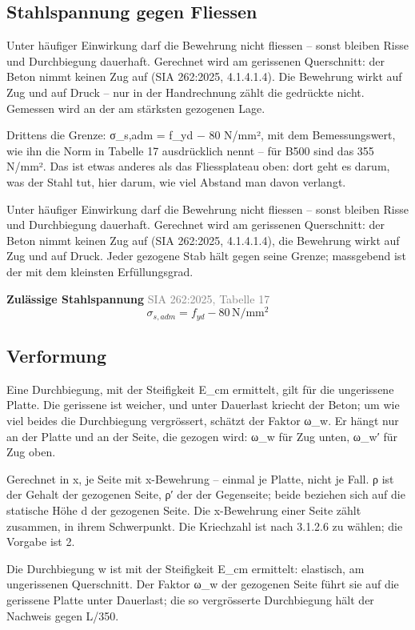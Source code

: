 \documentclass[11pt,a4paper]{article}
\newcommand{\normref}[1]{{\small\textcolor{gray}{#1}}}
\begin{document}
\subsection{Stahlspannung gegen Fliessen}
Unter häufiger Einwirkung darf die Bewehrung nicht fliessen – sonst bleiben Risse und Durchbiegung dauerhaft. Gerechnet wird am gerissenen Querschnitt: der Beton nimmt keinen Zug auf (SIA 262:2025, 4.1.4.1.4). Die Bewehrung wirkt auf Zug und auf Druck – nur in der Handrechnung zählt die gedrückte nicht. Gemessen wird an der am stärksten gezogenen Lage.

Drittens die Grenze: σ\_s,adm = f\_yd − 80 N/mm², mit dem Bemessungswert, wie ihn die Norm in Tabelle 17 ausdrücklich nennt – für B500 sind das 355 N/mm². Das ist etwas anderes als das Fliessplateau oben: dort geht es darum, was der Stahl tut, hier darum, wie viel Abstand man davon verlangt.

Unter häufiger Einwirkung darf die Bewehrung nicht fliessen – sonst bleiben Risse und Durchbiegung dauerhaft. Gerechnet wird am gerissenen Querschnitt: der Beton nimmt keinen Zug auf (SIA 262:2025, 4.1.4.1.4), die Bewehrung wirkt auf Zug und auf Druck. Jeder gezogene Stab hält gegen seine Grenze; massgebend ist der mit dem kleinsten Erfüllungsgrad.

\noindent\textbf{Zulässige Stahlspannung} \hfill \normref{SIA 262:2025, Tabelle 17}
\begin{equation*}
\sigma_{s,adm} = f_{yd} - 80\,\mathrm{N}/\mathrm{mm}^{2}
\end{equation*}
\subsection{Verformung}
Eine Durchbiegung, mit der Steifigkeit E\_cm ermittelt, gilt für die ungerissene Platte. Die gerissene ist weicher, und unter Dauerlast kriecht der Beton; um wie viel beides die Durchbiegung vergrössert, schätzt der Faktor ω\_w. Er hängt nur an der Platte und an der Seite, die gezogen wird: ω\_w für Zug unten, ω\_w′ für Zug oben.

Gerechnet in x, je Seite mit x-Bewehrung – einmal je Platte, nicht je Fall. ρ ist der Gehalt der gezogenen Seite, ρ′ der der Gegenseite; beide beziehen sich auf die statische Höhe d der gezogenen Seite. Die x-Bewehrung einer Seite zählt zusammen, in ihrem Schwerpunkt. Die Kriechzahl ist nach 3.1.2.6 zu wählen; die Vorgabe ist 2.

Die Durchbiegung w ist mit der Steifigkeit E\_cm ermittelt: elastisch, am ungerissenen Querschnitt. Der Faktor ω\_w der gezogenen Seite führt sie auf die gerissene Platte unter Dauerlast; die so vergrösserte Durchbiegung hält der Nachweis gegen L/350.
\end{document}
